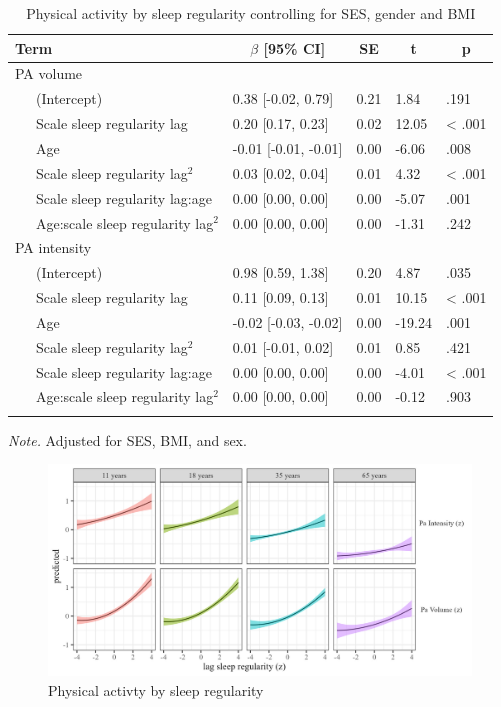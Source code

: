 \documentclass[
  man]{apa6}
\begin{document}
\begin{table}[tbp]

\begin{center}
\begin{threeparttable}

\caption{\label{tab:PA-by-sleep-regularity}Physical activity by sleep regularity controlling for SES, gender and BMI}

\begin{tabular}{lllll}
\toprule
Term & \multicolumn{1}{c}{$\beta$ [95\% CI]} & \multicolumn{1}{c}{SE} & \multicolumn{1}{c}{t} & \multicolumn{1}{c}{p}\\
\midrule
PA volume &  &  &  & \\
\ \ \ (Intercept) & 0.38 [-0.02, 0.79] & 0.21 & 1.84 & .191\\
\ \ \ Scale sleep regularity lag & 0.20 [0.17, 0.23] & 0.02 & 12.05 & < .001\\
\ \ \ Age & -0.01 [-0.01, -0.01] & 0.00 & -6.06 & .008\\
\ \ \ Scale sleep regularity lag$^2$ & 0.03 [0.02, 0.04] & 0.01 & 4.32 & < .001\\
\ \ \ Scale sleep regularity lag:age & 0.00 [0.00, 0.00] & 0.00 & -5.07 & .001\\
\ \ \ Age:scale sleep regularity lag$^2$ & 0.00 [0.00, 0.00] & 0.00 & -1.31 & .242\\
PA intensity &  &  &  & \\
\ \ \ (Intercept) & 0.98 [0.59, 1.38] & 0.20 & 4.87 & .035\\
\ \ \ Scale sleep regularity lag & 0.11 [0.09, 0.13] & 0.01 & 10.15 & < .001\\
\ \ \ Age & -0.02 [-0.03, -0.02] & 0.00 & -19.24 & .001\\
\ \ \ Scale sleep regularity lag$^2$ & 0.01 [-0.01, 0.02] & 0.01 & 0.85 & .421\\
\ \ \ Scale sleep regularity lag:age & 0.00 [0.00, 0.00] & 0.00 & -4.01 & < .001\\
\ \ \ Age:scale sleep regularity lag$^2$ & 0.00 [0.00, 0.00] & 0.00 & -0.12 & .903\\
\bottomrule
\addlinespace
\end{tabular}

\begin{tablenotes}[para]
\normalsize{\textit{Note.} Adjusted for SES, BMI, and sex. }
\end{tablenotes}

\end{threeparttable}
\end{center}

\end{table}

\begin{figure}
\includegraphics[width=1.1\linewidth]{../Figures/Pa on sleep_regularity_lag} \caption{Physical activty by sleep regularity}\label{fig:PA-by-sleep-regularity-fig}
\end{figure}
\end{document}
